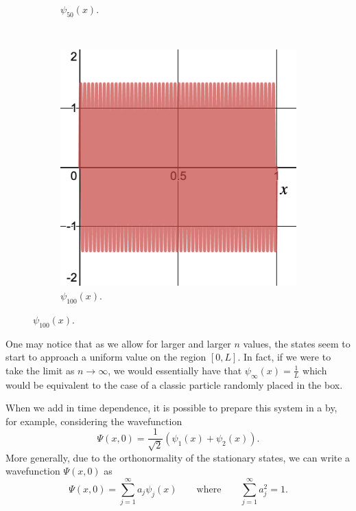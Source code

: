 \begin{figure}[H]
\begin{subfigure}[h]{0.3\textwidth}
        \caption{$\psi_{50}(x)$.}
    \end{subfigure}
    ~
    \begin{subfigure}[h]{0.3\textwidth}
        \includegraphics[width=\textwidth]{Figures_Part_2/state_100.png}
        \caption{$\psi_{100}(x)$.}
    \end{subfigure}
        \end{figure}

\noindent One may notice that as we allow for larger and larger $n$ values, the states seem to start to approach a uniform value on the region $[0,L]$. In fact, if we were to take the limit as $n\to \infty$, we would essentially have that $\psi_\infty(x) = \frac{1}{L}$ which would be equivalent to the case of a classic particle randomly placed in the box.

When we add in time dependence, it is possible to prepare this system in a  by, for example, considering the wavefunction
\[
\Psi(x,0) = \frac{1}{\sqrt{2}}\left(\psi_1(x) + \psi_2(x)\right).
\]
More generally, due to the orthonormality of the stationary states, we can write a wavefunction $\Psi(x,0)$ as
\[
\boxed{\Psi(x,0)=\sum_{j=1}^\infty a_j \psi_j(x) \qquad \textrm{where}\qquad \sum_{j=1}^\infty a_j^2 = 1.}
\]

